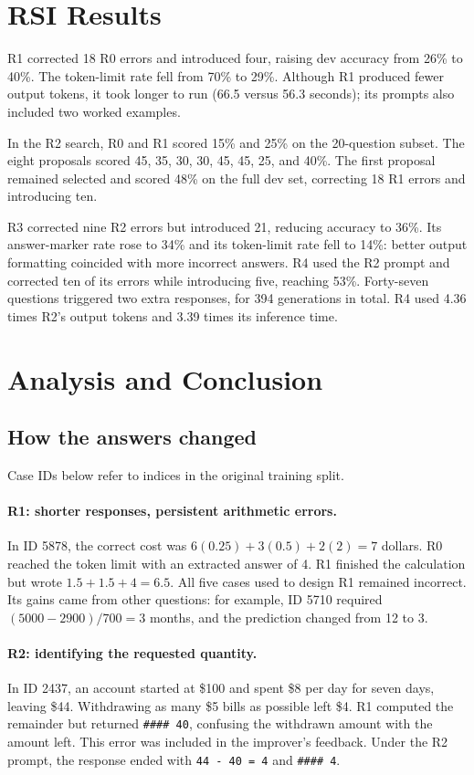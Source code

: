 \documentclass{article}
\begin{document}
\section{RSI Results}

R1 corrected 18 R0 errors and introduced four, raising dev accuracy from
26\% to 40\%. The token-limit rate fell from 70\% to 29\%.
Although R1 produced fewer output tokens, it took longer to run
(66.5 versus 56.3 seconds); its prompts also included two worked examples.

In the R2 search, R0 and R1 scored 15\% and 25\% on the 20-question subset.
The eight proposals scored 45, 35, 30, 30, 45, 45, 25, and 40\%.
The first proposal remained selected and scored 48\% on the full dev set,
correcting 18 R1 errors and introducing ten.

R3 corrected nine R2 errors but introduced 21, reducing accuracy to 36\%.
Its answer-marker rate rose to 34\% and its token-limit rate fell to 14\%:
better output formatting coincided with more incorrect answers.
R4 used the R2 prompt and corrected ten of its errors while introducing five,
reaching 53\%. Forty-seven questions triggered two extra responses, for
394 generations in total. R4 used 4.36 times R2's output tokens and
3.39 times its inference time.


\section{Analysis and Conclusion}
\subsection{How the answers changed}
Case IDs below refer to indices in the original training split.

\paragraph{R1: shorter responses, persistent arithmetic errors.}
In ID 5878, the correct cost was $6(0.25)+3(0.5)+2(2)=7$ dollars.
R0 reached the token limit with an extracted answer of 4. R1 finished the
calculation but wrote $1.5+1.5+4=6.5$.
All five cases used to design R1 remained incorrect. Its gains came from
other questions: for example, ID 5710 required $(5000-2900)/700=3$ months,
and the prediction changed from 12 to 3.

\paragraph{R2: identifying the requested quantity.}
In ID 2437, an account started at \$100 and spent \$8 per day for seven days,
leaving \$44. Withdrawing as many \$5 bills as possible left \$4.
R1 computed the remainder but returned \texttt{\#\#\#\# 40}, confusing
the withdrawn amount with the amount left. This error was included in
the improver's feedback. Under the R2 prompt, the response ended with
\texttt{44 - 40 = 4} and \texttt{\#\#\#\# 4}.
\end{document}
